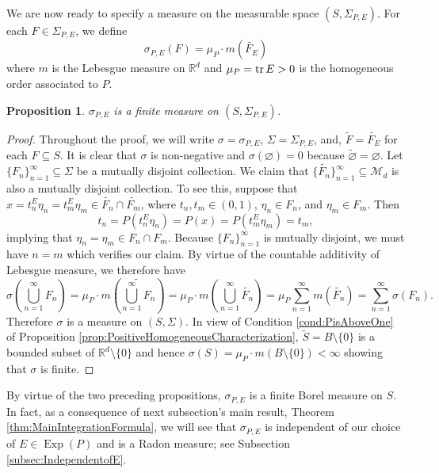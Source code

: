 \documentclass[11pt]{article}
\newtheorem{proposition}[theorem]{Proposition}
\newcommand\Exp{\operatorname{Exp}}
\begin{document}
\noindent We are now ready to specify a measure on the measurable space $(S,\Sigma_{P,E})$. For each $F\in \Sigma_{P,E}$, we define
\begin{equation*}
\sigma_{P,E}(F)=\mu_P\cdot m(\widetilde{F_E})
\end{equation*}
where $m$ is the Lebesgue measure on $\mathbb{R}^d$ and $\mu_P=\tr E>0$ is the homogeneous order associated to $P$.

\begin{proposition}\label{prop:sigmaisameaure}
$\sigma_{P,E}$ is a finite measure on $(S,\Sigma_{P,E})$.
\end{proposition}
\begin{proof}

\noindent Throughout the proof, we will write $\sigma=\sigma_{P,E}$, $\Sigma=\Sigma_{P,E}$, and, $\widetilde{F}=\widetilde{F_E}$ for each $F\subseteq S$. It is clear that $\sigma$ is non-negative and $\sigma(\varnothing)=0$ because $\widetilde{\varnothing}=\varnothing$. Let $\{ F_n  \}^\infty_{n=1} \subseteq \Sigma $ be a mutually disjoint collection. We claim that $\{ \widetilde{F_n} \}_{n=1}^\infty\subseteq\mathcal{M}_d$ is also a mutually disjoint collection. To see this, suppose that $x = t_n^E \eta_n = t_m^E \eta_m\in \widetilde{F_n}\cap\widetilde{F_m}$, where $t_n,t_m \in (0,1)$, $\eta_n \in F_n$, and $\eta_m \in F_m $. Then
\begin{equation*}
    t_n = P(t_n^E \eta_n) = P(x) = P(t_m^E \eta_m) = t_m,
\end{equation*}
implying that $\eta_n = \eta_m\in F_n\cap F_m$. Because $\{F_n\}_{n=1}^\infty$ is mutually disjoint, we must have $n=m$ which verifies our claim. By virtue of the countable additivity of Lebesgue measure, we therefore have
\begin{equation*}
\sigma\left(\bigcup_{n=1}^\infty F_n\right)
    = \mu_P\cdot m\left( \widetilde{\bigcup^\infty_{n=1} F_n } \right)=\mu_P\cdot m\left( \bigcup^\infty_{n=1}\widetilde{F_n} \right)
    = \mu_P\sum^\infty_{n=1} m(\widetilde{F_n})
    = \sum^\infty_{n=1}\sigma(F_n).
\end{equation*}
Therefore $\sigma$ is a measure on $(S,\Sigma)$. In view of Condition \ref{cond:PisAboveOne} of Proposition \ref{prop:PositiveHomogeneousCharacterization}, $\widetilde{S}=B\setminus\{0\}$ is a bounded subset of $\mathbb{R}^d\setminus\{0\}$ and hence $\sigma(S)=\mu_P\cdot m(B\setminus\{0\})<\infty$ showing that $\sigma$ is finite.
\end{proof}

\noindent By virtue of the two preceding propositions, $\sigma_{P,E}$ is a finite Borel measure on $S$. In fact, as a consequence of next subsection's main result, Theorem \ref{thm:MainIntegrationFormula}, we will see that $\sigma_{P,E}$ is independent of our choice of $E\in\Exp(P)$ and is a Radon measure; see Subsection \ref{subsec:IndependentofE}.
\end{document}
